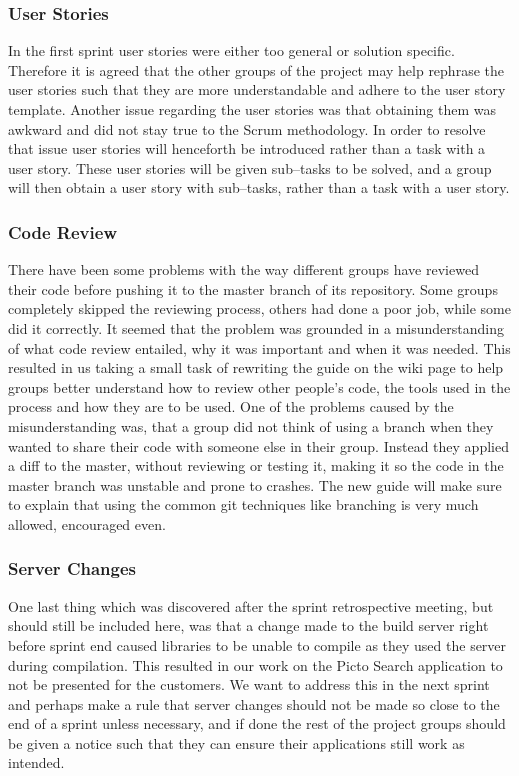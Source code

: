 \subsubsection{User Stories}
In the first sprint user stories were either too general or solution specific.
Therefore it is agreed that the other groups of the project may help rephrase the user stories such that they are more understandable and adhere to the user story template.
Another issue regarding the user stories was that obtaining them was awkward and did not stay true to the Scrum methodology.
In order to resolve that issue user stories will henceforth be introduced rather than a task with a user story.
These user stories will be given sub--tasks to be solved, and a group will then obtain a user story with sub--tasks, rather than a task with a user story.

\subsubsection{Code Review}
There have been some problems with the way different groups have reviewed their code before pushing it to the master branch of its repository.
Some groups completely skipped the reviewing process, others had done a poor job, while some did it correctly.
It seemed that the problem was grounded in a misunderstanding of what code review entailed, why it was important and when it was needed.
This resulted in us taking a small task of rewriting the guide on the wiki page to help groups better understand how to review other people's code, the tools used in the process and how they are to be used.
One of the problems caused by the misunderstanding was, that a group did not think of using a branch when they wanted to share their code with someone else in their group.
Instead they applied a diff to the master, without reviewing or testing it, making it so the code in the master branch was unstable and prone to crashes.
The new guide will make sure to explain that using the common git techniques like branching is very much allowed, encouraged even.

\subsubsection{Server Changes}
One last thing which was discovered after the sprint retrospective meeting, but should still be included here, was that a change made to the build server right before sprint end caused libraries to be unable to compile as they used the server during compilation.
This resulted in our work on the Picto Search application to not be presented for the customers.
We want to address this in the next sprint and perhaps make a rule that server changes should not be made so close to the end of a sprint unless necessary, and if done the rest of the project groups should be given a notice such that they can ensure their applications still work as intended.

